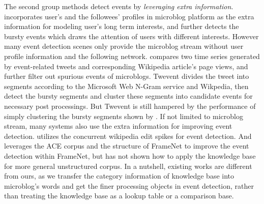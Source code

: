 \documentclass[runningheads,a4paper]{llncs}
\begin{document}
The second group methods detect events by \textit{leveraging extra information}. 
\cite{huang2016efficient} incorporates user's and the followees' profiles in microblog platform as the extra information for modeling user's long term interests, and further detects the bursty events which draws the attention of users with different interests. 
However many event detection scenes only provide the microblog stream without user profile information and the following network.
\cite{osborne2012bieber} compares two time series generated by event-related tweets and corresponding Wikipedia article's page views, and further filter out spurious events of microblogs.
Twevent \cite{Twevent2012} divides the tweet into segments according to the Microsoft Web N-Gram service and Wikpedia, then detect the bursty segments and cluster these segments into candidate events for necessary post processings.
But Twevent is still hampered by the performance of simply clustering the bursty segments shown by \cite{Yan:2015wm}.
If not limited to microblog stream, many systems also use the extra information for improving event detection.
\cite{steiner2013mj} utilizes the concurrent wikipedia edit spikes for event detection.
And \cite{liuleveraging2016} leverages the ACE corpus\cite{doddington2004automatic} and the structure of FrameNet\cite{baker1998berkeley} to improve the event detection within FrameNet, but has not shown how to apply the knowledge base for more general unstructured corpus.
In a nutshell, existing works are different from ours, as we transfer the category information of knowledge base into microblog's words and get the finer processing objects in event detection, rather than treating the knowledge base as a lookup table or a comparison base.


\end{document}
